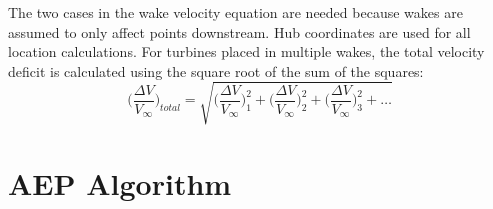 \documentclass[10pt]{article}
\begin{document}
    The two cases in the wake velocity equation are needed because wakes are assumed to only affect points downstream.
    Hub coordinates are used for all location calculations.
    For turbines placed in multiple wakes, the total velocity deficit is calculated using the square root of the sum of the squares:
    \begin{equation}
    \label{Eq:CmbndWake}
        \bigg(\frac{\Delta V}{V_{\infty}}\bigg)_{total} = 
            \sqrt{
                \bigg(\frac{\Delta V}{V_{\infty}}\bigg)_{1}^{2} +
                \bigg(\frac{\Delta V}{V_{\infty}}\bigg)_{2}^{2} +
                \bigg(\frac{\Delta V}{V_{\infty}}\bigg)_{3}^{2} +
                \dots}
    \end{equation}

\section*{AEP Algorithm}
    
\end{document}
